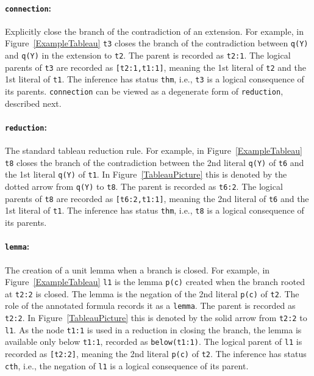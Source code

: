 \documentclass{ceurart}
\newcommand{\smalltt}[1]{\small \texttt{#1}}
\newcommand{\tildenot}{\raisebox{0.4ex}{\texttildelow}}
\begin{document}
\paragraph{{\tt connection}:} Explicitly close the branch of the contradiction of an extension.
For example, in Figure~\ref{ExampleTableau} \smalltt{t3} closes the branch of the contradiction 
between \smalltt{q(Y)} and \smalltt{{\tildenot}q(Y)} in the extension to \smalltt{t2}.
The parent is recorded as \smalltt{t2:1}.
The logical parents of \smalltt{t3} are recorded as \smalltt{[t2:1,t1:1]}, meaning the 1st 
literal of \smalltt{t2} and the 1st literal of \smalltt{t1}. 
The inference has status \smalltt{thm}, i.e., \smalltt{t3} is a logical consequence of its
parents. 
{\tt connection} can be viewed as a degenerate form of {\tt reduction}, described next.

\paragraph{{\tt reduction}:} The standard tableau reduction rule.
For example, in Figure~\ref{ExampleTableau} \smalltt{t8} closes the branch of the contradiction 
between the 2nd literal \smalltt{{\tildenot}q(Y)} of \smalltt{t6} and the 1st literal 
\smalltt{q(Y)} of \smalltt{t1}.
In Figure~\ref{TableauPicture} this is denoted by the dotted arrow from \smalltt{q(Y)}
to \smalltt{t8}.
The parent is recorded as \smalltt{t6:2}.
The logical parents of \smalltt{t8} are recorded as \smalltt{[t6:2,t1:1]}, meaning the 2nd 
literal of \smalltt{t6} and the 1st literal of \smalltt{t1}. 
The inference has status \smalltt{thm}, i.e., \smalltt{t8} is a logical consequence of its 
parents.

\paragraph{{\tt lemma}:} The creation of a unit lemma when a branch is closed.
For example, in Figure~\ref{ExampleTableau} \smalltt{l1} is the lemma \smalltt{p(c)} created 
when the branch rooted at \smalltt{t2:2} is closed.
The lemma is the negation of the 2nd literal \smalltt{{\tildenot}p(c)} of \smalltt{t2}.
The role of the annotated formula records it as a {\tt lemma}.
The parent is recorded as \smalltt{t2:2}.
In Figure~\ref{TableauPicture} this is denoted by the solid arrow from \smalltt{t2:2} to 
\smalltt{l1}.
As the node \smalltt{t1:1} is used in a reduction in closing the branch, the lemma is
available only below \smalltt{t1:1}, recorded as \smalltt{below(t1:1)}.
The logical parent of \smalltt{l1} is recorded as \smalltt{[t2:2]}, meaning the 2nd literal 
\smalltt{{\tildenot}p(c)} of \smalltt{t2}.
The inference has status \smalltt{cth}, i.e., the negation of \smalltt{l1} is a logical 
consequence of its parent.
\end{document}
